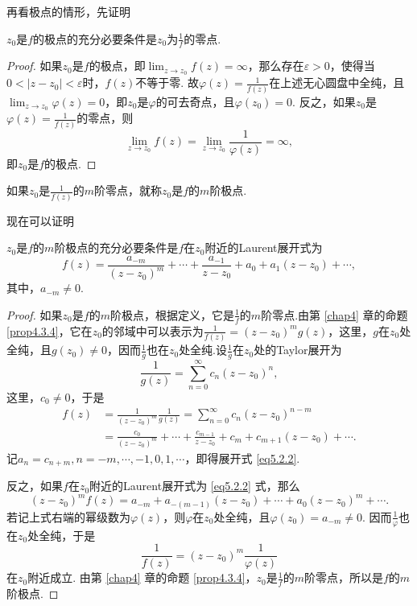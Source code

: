 再看极点的情形，先证明
\begin{prop}\label{prop5.2.2}
  $z_0$是$f$的极点的充分必要条件是$z_0$为$\frac1f$的零点.
\end{prop}
\begin{proof}
  如果$z_0$是$f$的极点，即$\lim_{z\to z_0}f(z)=\infty$，那么存在$\varepsilon>0$，使得当$0<|z-z_0|<\varepsilon$时，$f(z)$不等于零. 故$\varphi(z)=\frac1{f(z)}$在上述无心圆盘中全纯，且$\lim_{z\to z_0}\varphi(z)=0$，即$z_0$是$\varphi$的可去奇点，且$\varphi(z_0)=0$. 反之，如果$z_0$是$\varphi(z)=\frac1{f(z)}$的零点，则
  \[
    \lim_{z\to z_0}f(z) = \lim_{z\to z_0}\frac1{\varphi(z)} = \infty,
  \]
  即$z_0$是$f$的极点.
\end{proof}

\begin{definition}\label{def5.2.3}
  如果$z_0$是$\frac1{f(z)}$的$m$阶零点，就称$z_0$是$f$的$m$阶极点.
\end{definition}

现在可以证明
\begin{theorem}\label{thm5.2.4}
  $z_0$是$f$的$m$阶极点的充分必要条件是$f$在$z_0$附近的Laurent展开式为
  \begin{equation}\label{eq5.2.2}
    f(z) = \frac{a_{-m}}{(z-z_0)^m} + \cdots+\frac{a_{-1}}{z-z_0} + a_0 + a_1(z-z_0) + \cdots,
  \end{equation}
  其中，$a_{-m}\ne0$.
\end{theorem}
\begin{proof}
  如果$z_0$是$f$的$m$阶极点，根据定义，它是$\frac1f$的$m$阶零点.由第 \ref{chap4} 章的命题 \ref{prop4.3.4}，它在$z_0$的邻域中可以表示为$\frac1{f(z)}=(z-z_0)^mg(z)$，这里，$g$在$z_0$处全纯，且$g(z_0)\ne0$，因而$\frac1g$也在$z_0$处全纯.设$\frac1g$在$z_0$处的Taylor展开为
  \[
    \frac1{g(z)} = \sum_{n=0}^\infty c_n(z-z_0)^n,
  \]
  这里，$c_0\ne0$，于是
  \begin{align*}
    f(z) & = \frac1{(z-z_0)^m}\frac1{g(z)} = \sum_{n=0}^\infty c_n(z-z_0)^{n-m}\\
    & = \frac{c_0}{(z-z_0)^m} + \cdots + \frac{c_{m-1}}{z-z_0}
      + c_m + c_{m+1}(z-z_0) + \cdots.
  \end{align*}
  记$a_n=c_{n+m},n=-m,\cdots,-1,0,1,\cdots$，即得展开式 \eqref{eq5.2.2}.

  反之，如果$f$在$z_0$附近的Laurent展开式为 \eqref{eq5.2.2} 式，那么
  \[
    (z-z_0)^mf(z) = a_{-m}+a_{-(m-1)}(z-z_0) + \cdots + a_0(z-z_0)^m + \cdots.
  \]
  若记上式右端的幂级数为$\varphi(z)$，则$\varphi$在$z_0$处全纯，且$\varphi(z_0)=a_{-m}\ne0$. 因而$\frac1{\varphi}$也在$z_0$处全纯，于是
  \[
    \frac1{f(z)} = (z-z_0)^m\frac1{\varphi(z)}
  \]
  在$z_0$附近成立. 由第 \ref{chap4} 章的命题 \ref{prop4.3.4}，$z_0$是$\frac1f$的$m$阶零点，所以是$f$的$m$阶极点.
\end{proof}

